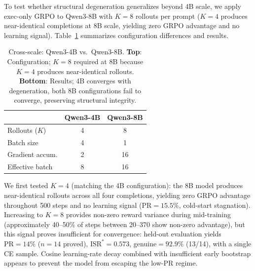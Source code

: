 To test whether structural degeneration generalizes beyond 4B scale, we apply exec-only GRPO to Qwen3-8B with $K{=}8$ rollouts per prompt ($K{=}4$ produces near-identical completions at 8B scale, yielding zero GRPO advantage and no learning signal).
Table~\ref{tab:8b-combined} summarizes configuration differences and results.

\begin{table}[H]
\centering
\small
\begin{tabular}{lcc}
\toprule
& \textbf{Qwen3-4B} & \textbf{Qwen3-8B} \\
\midrule
Rollouts ($K$) & 4 & 8 \\
Batch size & 4 & 1 \\
Gradient accum. & 2 & 16 \\
Effective batch & 8 & 16 \\
\bottomrule
\end{tabular}

\vspace{4pt}

\caption{Cross-scale: Qwen3-4B vs.\ Qwen3-8B. \textbf{Top}: Configuration; $K{=}8$ required at 8B because $K{=}4$ produces near-identical rollouts. \textbf{Bottom}: Results; 4B converges with degeneration, both 8B configurations fail to converge, preserving structural integrity.}
\label{tab:8b-combined}
\end{table}

We first tested $K{=}4$ (matching the 4B configuration): the 8B model produces near-identical rollouts across all four completions, yielding zero GRPO advantage throughout 500 steps and no learning signal ($\text{PR}{=}15.5\%$, cold-start stagnation).
Increasing to $K{=}8$ provides non-zero reward variance during mid-training (approximately 40--50\% of steps between 20--370 show non-zero advantage), but this signal proves insufficient for convergence: held-out evaluation yields $\text{PR}{=}14\%$ ($n{=}14$ proved), $\text{ISR}^*{=}0.573$, genuine${=}92.9\%$ (13/14), with a single CE sample.
Cosine learning-rate decay combined with insufficient early bootstrap appears to prevent the model from escaping the low-PR regime.

